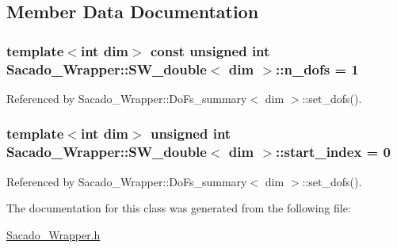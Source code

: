 \subsection{Member Data Documentation}
\subsubsection[{\texorpdfstring{n\+\_\+dofs}{n_dofs}}]{\setlength{\rightskip}{0pt plus 5cm}template$<$int dim$>$ const unsigned int {\bf Sacado\+\_\+\+Wrapper\+::\+S\+W\+\_\+double}$<$ dim $>$\+::n\+\_\+dofs = 1\hspace{0.3cm}{\ttfamily [static]}}\hypertarget{classSacado__Wrapper_1_1SW__double_a45e46904e5fd5be42bb4c9bb7454ffc5}{}\label{classSacado__Wrapper_1_1SW__double_a45e46904e5fd5be42bb4c9bb7454ffc5}


Referenced by Sacado\+\_\+\+Wrapper\+::\+Do\+Fs\+\_\+summary$<$ dim $>$\+::set\+\_\+dofs().

\subsubsection[{\texorpdfstring{start\+\_\+index}{start_index}}]{\setlength{\rightskip}{0pt plus 5cm}template$<$int dim$>$ unsigned int {\bf Sacado\+\_\+\+Wrapper\+::\+S\+W\+\_\+double}$<$ dim $>$\+::start\+\_\+index = 0}\hypertarget{classSacado__Wrapper_1_1SW__double_aa0927ce06528899dd44afe5d770840c1}{}\label{classSacado__Wrapper_1_1SW__double_aa0927ce06528899dd44afe5d770840c1}


Referenced by Sacado\+\_\+\+Wrapper\+::\+Do\+Fs\+\_\+summary$<$ dim $>$\+::set\+\_\+dofs().



The documentation for this class was generated from the following file\+:\begin{DoxyCompactItemize}
\item 
\hyperlink{Sacado__Wrapper_8h}{Sacado\+\_\+\+Wrapper.\+h}\end{DoxyCompactItemize}
